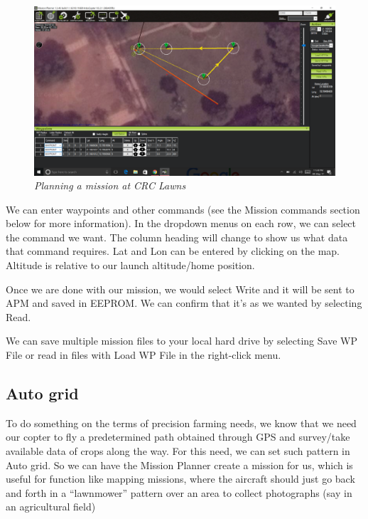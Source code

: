 \begin{figure}[h]
	\includegraphics[width=1.0\linewidth]{svnit_auto_2}
	\centering
	\caption{\label{fig: svnit_auto_2}\textit{Planning a mission at CRC Lawns}}
\end{figure}

We can enter waypoints and other commands (see the Mission commands section below for more information). In the dropdown menus on each row, we can select the command we want. The column heading will change to show us what data that command requires. Lat and Lon can be entered by clicking on the map. Altitude is relative to our launch altitude/home position.

Once we are done with our mission, we would select Write and it will be sent to APM and saved in EEPROM. We can confirm that it’s as we wanted by selecting Read.

We can save multiple mission files to your local hard drive by selecting Save WP File or read in files with Load WP File in the right-click menu. 

\subsection{Auto grid}

To do something on the terms of precision farming needs, we know that we need our copter to fly a predetermined path obtained through GPS and survey/take available data of crops along the way. For this need, we can set such pattern in Auto grid. So we can have the Mission Planner create a mission for us, which is useful for function like mapping missions, where the aircraft should just go back and forth in a “lawnmower” pattern over an area to collect photographs (say in an agricultural field)


